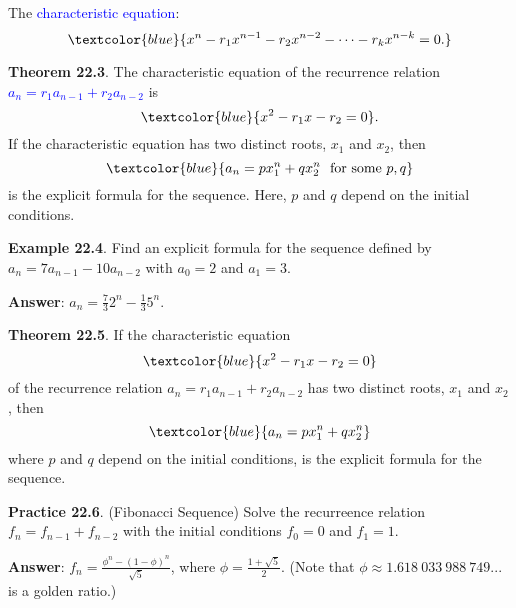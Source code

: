 \documentclass[aspectratio=169]{beamer}
\providecommand{\Blue}[1]{\textcolor{blue}{#1}}
\begin{document}
\begin{frame}[plain]{}

 The \Blue{characteristic equation}:
    \[ \Blue{x^n - r_1x^{n-1} - r_{2}x^{n-2} - \cdots - r_kx^{n-k} = 0. } 
   \]
 
  {\bf Theorem 22.3}. The characteristic equation of
  the recurrence relation \Blue{$a_n = r_1a_{n-1}+r_2a_{n-2}$} is
     \[ \Blue{x^2 - r_1x - r_{2} = 0}.
     \]
     If the characteristic equation has 
     two distinct roots, $x_1$ and $x_2$, then 
     \[ \Blue{a_n = px_1^n + qx_2^n \ \ \mbox{for\ some}\ p, q}
     \]
     is the explicit formula
     for the sequence. Here, $p$ and $q$ depend on the initial conditions.
     \medskip
   
  {\bf Example 22.4}. Find an explicit formula for the sequence defined by 
    $a_n = 7a_{n-1} - 10a_{n-2}$ with $a_0=2$ and $a_1=3$.\pause
    \medskip
    
    {\bf Answer}: $a_n = \frac{7}{3}2^n - \frac{1}{3}5^n$.

\end{frame}


\begin{frame}[plain]{}

 {\bf Theorem 22.5}. If the characteristic equation 
     \[ \Blue{x^2 - r_1x - r_{2} = 0 }
     \]
     of the recurrence relation $a_n = r_1a_{n-1}+r_2a_{n-2}$ has 
     two distinct roots, $x_1$ and $x_2$, then 
     \[ \Blue{a_n = px_1^n + qx_2^n} 
     \]
     where $p$ and $q$ depend on the initial conditions, is the explicit formula
     for the sequence.
     \medskip
     
 {\bf Practice 22.6}. (Fibonacci Sequence) Solve the recurreence relation
    $f_n = f_{n-1}+f_{n-2}$ with the initial conditions $f_0=0$ and $f_1=1$. \pause
    \medskip
    
    {\bf Answer}: $f_n = \frac{\phi^n - (1-\phi)^n}{\sqrt{5}}$, where $\phi = \frac{1+\sqrt{5}}{2}$.
        (Note that $\phi\approx 1.618\ 033\ 988\ 749...$ is a golden ratio.)
    
    \vspace{.4in}
         
\end{frame}
\end{document}
